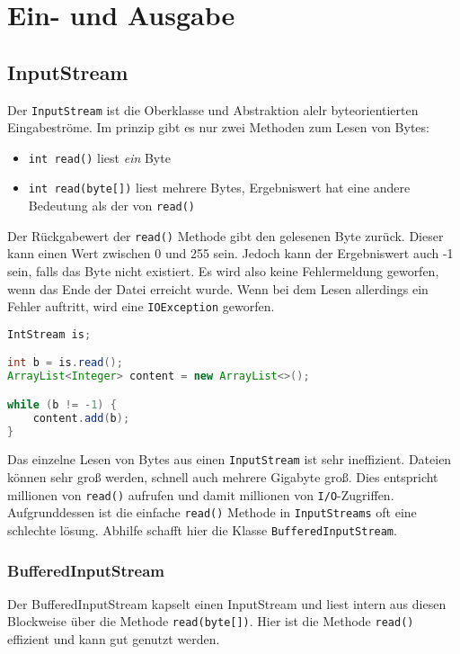 \chapter{Ein- und Ausgabe}

\section{InputStream}

Der \lstinline{InputStream} ist die Oberklasse und Abstraktion alelr
byteorientierten Eingabeströme. Im prinzip gibt es nur zwei Methoden zum Lesen
von Bytes:
\begin{itemize}
    \item \lstinline{int read()} liest \textit{ein} Byte
    \item \lstinline{int read(byte[])} liest mehrere Bytes, Ergebniswert hat eine andere
          Bedeutung als der von \lstinline{read()}
\end{itemize}

Der Rückgabewert der \lstinline{read()} Methode gibt den gelesenen Byte zurück.
Dieser kann einen Wert zwischen 0 und 255 sein. Jedoch kann der Ergebniswert
auch -1 sein, falls das Byte nicht existiert. Es wird also keine Fehlermeldung
geworfen, wenn das Ende der Datei erreicht wurde. Wenn bei dem Lesen allerdings
ein Fehler auftritt, wird eine \lstinline{IOException} geworfen.

\begin{lstlisting}[language=Java, caption={Beispiel für IntStream}]
IntStream is;

int b = is.read();
ArrayList<Integer> content = new ArrayList<>();

while (b != -1) {
    content.add(b);
}
\end{lstlisting}

Das einzelne Lesen von Bytes aus einen \lstinline{InputStream} ist sehr
ineffizient. Dateien können sehr groß werden, schnell auch mehrere Gigabyte
groß. Dies entspricht millionen von \lstinline{read()} aufrufen und damit
millionen von \texttt{I/O}-Zugriffen. Aufgrunddessen ist die einfache
\lstinline{read()} Methode in \lstinline{InputStreams} oft eine schlechte
lösung. Abhilfe schafft hier die Klasse \lstinline{BufferedInputStream}.

\subsection{BufferedInputStream}

Der BufferedInputStream kapselt einen InputStream und liest intern aus diesen
Blockweise über die Methode
\lstinline{read(byte[])}. Hier ist die Methode \lstinline{read()} effizient und
kann gut genutzt werden.